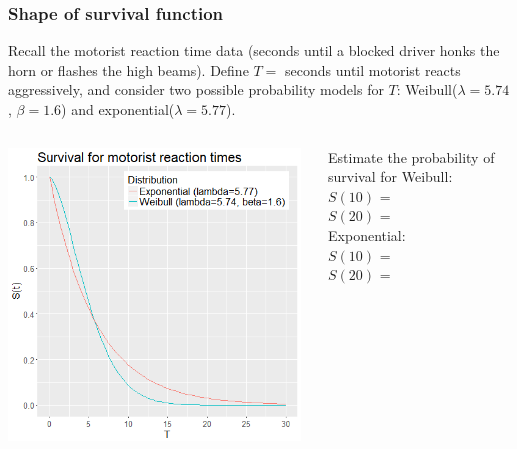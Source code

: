 \begin{frame}
\frametitle{Shape of survival function}
Recall the motorist reaction time data (seconds until a blocked driver honks the horn or flashes the high beams). Define $T=$ seconds until motorist reacts aggressively, and consider two possible probability models for $T$: Weibull($\lambda=5.74$, $\beta=1.6$) and exponential($\lambda=5.77$). \\
\vskip3pt
\begin{columns}
\includegraphics[width=0.98\textwidth]{Figures/motorist_surv_weib_exp.png}
\begin{clicker}{Estimate the probability of survival for}
Weibull:\\
$S(10)$ = \\ %
$S(20)$ = \\ %
\emp
{}
Exponential:\\
$S(10)$ = \\ %
$S(20)$ = \\ %
\emp
\end{clicker}
\end{columns}
\end{frame}


